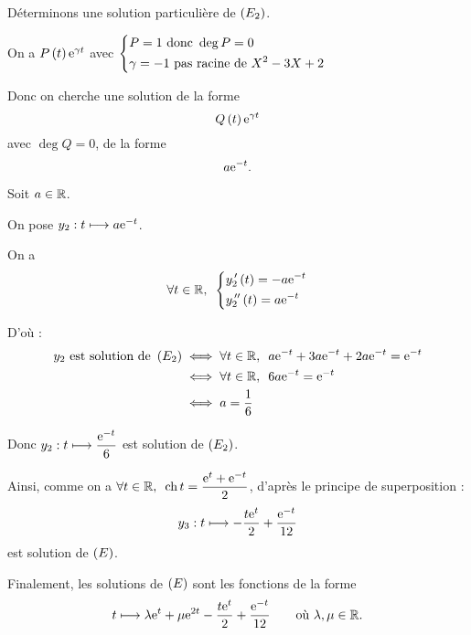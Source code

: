 \begin{corr}[1]
Déterminons une solution particulière de \(\left(E_2\right)\).

\begin{brouill}
On a \(P\left(t\right)\mathrm{e}^{\gamma t}\) avec \(\begin{dcases}
P=1\text{ donc }\deg P=0 \\
\gamma=-1\text{ pas racine de }X^2-3X+2
\end{dcases}\)

Donc on cherche une solution de la forme \[Q\left(t\right)\mathrm{e}^{\gamma t}\] avec \(\deg Q=0\), \cad de la forme \[a\mathrm{e}^{-t}.\]
\end{brouill}

Soit \(a\in\mathbb{R}\).

On pose \(y_2:t\longmapsto a\mathrm{e}^{-t}\).

On a \[\quantifs{\forall t\in\R}\begin{dcases}
y_2\prim\paren{t}=-a\e{-t} \\
y_2\seconde\paren{t}=a\e{-t}
\end{dcases}\]

D'où : \[\begin{aligned}
y_2\text{ est solution de }\paren{E_2}&\ssi\quantifs{\forall t\in\R}a\e{-t}+3a\e{-t}+2a\e{-t}=\e{-t} \\
&\ssi\quantifs{\forall t\in\R}6a\e{-t}=\e{-t} \\
&\ssi a=\dfrac{1}{6}
\end{aligned}\]

Donc \(y_2:t\longmapsto\dfrac{\mathrm{e}^{-t}}{6}\) est solution de \(\left(E_2\right)\).

Ainsi, comme on a \(\quantifs{\forall t\in\R}\ch t=\dfrac{\e{t}+\e{-t}}{2}\), d'après le principe de superposition : \[y_3:t\longmapsto-\dfrac{t\mathrm{e}^{t}}{2}+\dfrac{\mathrm{e}^{-t}}{12}\] est solution de \(\left(E\right)\).

Finalement, les solutions de \(\left(E\right)\) sont les fonctions de la forme \[t\longmapsto\lambda\mathrm{e}^{t}+\mu\mathrm{e}^{2t}-\dfrac{t\mathrm{e}^{t}}{2}+\dfrac{\mathrm{e}^{-t}}{12}\qquad\text{où }\lambda,\mu\in\mathbb{R}.\]
\end{corr}


